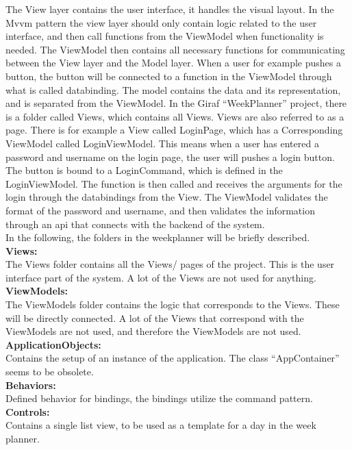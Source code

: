 The View layer contains the user interface, it handles the visual layout. In the \gls{Mvvm} pattern the view layer should only contain logic related to the user interface, and then call functions from the ViewModel when functionality is needed. The ViewModel then contains all necessary functions for communicating between the View layer and the Model layer. When a user for example pushes a button, the button will be connected to a function in the ViewModel through what is called databinding. 
The model contains the data and its representation, and is separated from the ViewModel. 
In the Giraf “WeekPlanner” project, there is a folder called Views, which contains all Views. Views are also referred to as a page. There is for example a View called LoginPage, which has a Corresponding ViewModel called LoginViewModel. This means when a user has entered a password and username on the login page, the user will pushes a login button. The button is bound to a LoginCommand, which is defined in the LoginViewModel. The function is then called and receives the arguments for the login through the databindings from the View. The ViewModel validates the format of the password and username, and then validates the information through an api that connects with the backend of the system. 
\\
In the following, the folders in the weekplanner will be briefly described.
\\
\textbf{Views:}\\
The Views folder contains all the Views/ pages of the project. This is the user interface part of the system. A lot of the Views are not used for anything. 
\\
\textbf{ViewModels:}\\
The ViewModels folder contains the logic that corresponds to the Views. These will be directly connected. A lot of the Views that correspond with the ViewModels are not used, and therefore the ViewModels are not used.
\\
\textbf{ApplicationObjects:}\\
Contains the setup of an instance of the application. The class “AppContainer” seems to be obsolete. 
\\
\textbf{Behaviors: }\\
Defined behavior for bindings, the bindings utilize the command pattern. 
\\
\textbf{Controls:}\\
Contains a single list view, to be used as a template for a day in the week planner. 
\\
